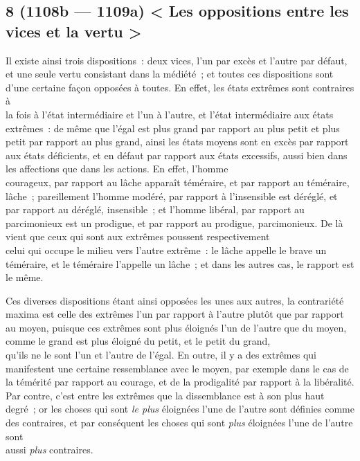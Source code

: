 \documentclass[french,twoside]{book} %
\begin{document}
\subsection[{8 (1108b — 1109a) < Les oppositions entre les vices et la vertu >}]{8 (1108b — 1109a) < Les oppositions entre les vices et la vertu >}
\noindent Il existe ainsi trois dispositions : deux vices, l’un par excès et l’autre par défaut, et une seule vertu consistant dans la médiété ; et toutes ces dispositions sont d’une certaine façon opposées à toutes. En effet, les états extrêmes sont contraires à \\
la fois à l’état intermédiaire et l’un à l’autre, et l’état intermédiaire aux états extrêmes : de même que l’égal est plus grand par rapport au plus petit et plus petit par rapport au plus grand, ainsi les états moyens sont en excès par rapport aux états déficients, et en défaut par rapport aux états excessifs, aussi bien dans les affections que dans les actions. En effet, l’homme \\
courageux, par rapport au lâche apparaît téméraire, et par rapport au téméraire, lâche ; pareillement l’homme modéré, par rapport à l’insensible est déréglé, et par rapport au déréglé, insensible ; et l’homme libéral, par rapport au parcimonieux est un prodigue, et par rapport au prodigue, parcimonieux. De là vient que ceux qui sont aux extrêmes poussent respectivement \\
celui qui occupe le milieu vers l’autre extrême : le lâche appelle le brave un téméraire, et le téméraire l’appelle un lâche ; et dans les autres cas, le rapport est le même.\par
Ces diverses dispositions étant ainsi opposées les unes aux autres, la contrariété maxima est celle des extrêmes l’un par rapport à l’autre plutôt que par rapport au moyen, puisque ces extrêmes sont plus éloignés l’un de l’autre que du moyen, comme le grand est plus éloigné du petit, et le petit du grand, \\
qu’ils ne le sont l’un et l’autre de l’égal. En outre, il y a des extrêmes qui manifestent une certaine ressemblance avec le moyen, par exemple dans le cas de la témérité par rapport au courage, et de la prodigalité par rapport à la libéralité. Par contre, c’est entre les extrêmes que la dissemblance est à son plus haut degré ; or les choses qui sont {\itshape le plus} éloignées l’une de l’autre sont définies comme des contraires, et par conséquent les choses qui sont {\itshape plus} éloignées l’une de l’autre sont \\
aussi {\itshape plus} contraires.\par
\end{document}
